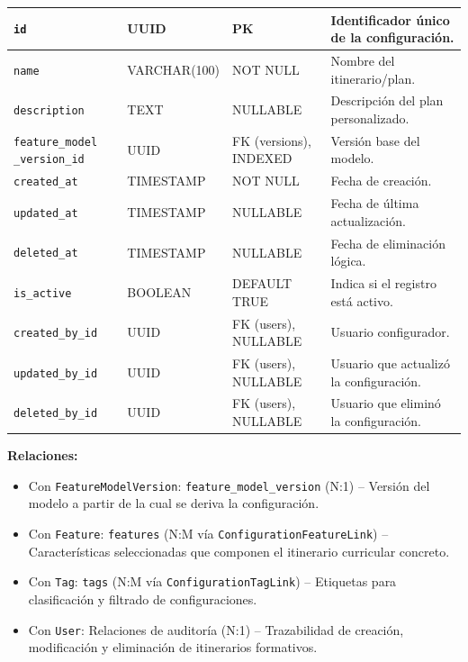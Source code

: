 {{{\begin{longtable}{|p{}|p{}|p{}|p{}|}
                \hline
                \endlastfoot
                
                \texttt{id} & UUID & PK & Identificador único de la configuración. \\
                \hline
                \rowcolor[HTML]{EDEBF1}
                \texttt{name} & VARCHAR(100) & NOT NULL & Nombre del itinerario/plan. \\
                \hline
                \texttt{description} & TEXT & NULLABLE & Descripción del plan personalizado. \\
                \hline
                \rowcolor[HTML]{EDEBF1}
                \texttt{feature\_model 
                \_version\_id} & UUID & FK (versions), INDEXED & Versión base del modelo. \\
                \hline
                \texttt{created\_at} & TIMESTAMP & NOT NULL & Fecha de creación. \\
                \hline
                \rowcolor[HTML]{EDEBF1}
                \texttt{updated\_at} & TIMESTAMP & NULLABLE & Fecha de última actualización. \\
                \hline
                \texttt{deleted\_at} & TIMESTAMP & NULLABLE & Fecha de eliminación lógica. \\
                \hline
                \rowcolor[HTML]{EDEBF1}
                \texttt{is\_active} & BOOLEAN & DEFAULT TRUE & Indica si el registro está activo. \\
                \hline
                \texttt{created\_by\_id} & UUID & FK (users), NULLABLE & Usuario configurador. \\
                \hline
                \rowcolor[HTML]{EDEBF1}
                \texttt{updated\_by\_id} & UUID & FK (users), NULLABLE & Usuario que actualizó la configuración. \\
                \hline
                \texttt{deleted\_by\_id} & UUID & FK (users), NULLABLE & Usuario que eliminó la configuración. \\
                \hline
            \end{longtable}

            \textbf{Relaciones:}
            \begin{itemize}
                \item Con \texttt{FeatureModelVersion}: \texttt{feature\_model\_version} (N:1) -- Versión del modelo a partir de la cual se deriva la configuración.
                \item Con \texttt{Feature}: \texttt{features} (N:M vía \texttt{ConfigurationFeatureLink}) -- Características seleccionadas que componen el itinerario curricular concreto.
                \item Con \texttt{Tag}: \texttt{tags} (N:M vía \texttt{ConfigurationTagLink}) -- Etiquetas para clasificación y filtrado de configuraciones.
                \item Con \texttt{User}: Relaciones de auditoría (N:1) -- Trazabilidad de creación, modificación y eliminación de itinerarios formativos.
            \end{itemize}

        }   
    }
}

